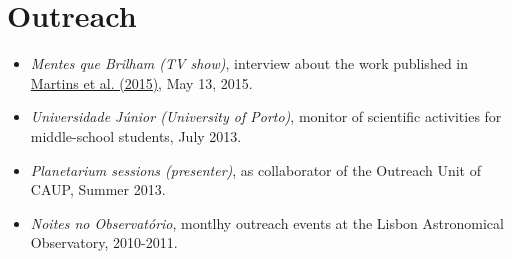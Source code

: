 \documentclass[10pt]{article}
\makeatletter
\renewcommand{\labelenumi}{\@biblabel{A\theenumi}} %
\makeatother
\begin{document}
\begin{longtable}{@{}r|p{14cm}}



\end{longtable}

\ifoutreach

\section{Outreach}
\begin{itemize}
\item \emph{Mentes que Brilham (TV show)}, interview about the work published in \href{http://adsabs.harvard.edu/cgi-bin/nph-abs_connect?fforward=http://dx.doi.org/10.1051/0004-6361/201425298}{Martins et al. (2015)}, May 13, 2015.
\item \emph{Universidade Júnior (University of Porto)}, monitor of scientific activities for middle-school students, July 2013.
\item \emph{Planetarium sessions (presenter)}, as collaborator of the Outreach Unit of CAUP, Summer 2013.
\item \emph{Noites no Observatório}, montlhy outreach events at the Lisbon Astronomical Observatory, 2010-2011.
\end{itemize}

\fi
\end{document}
